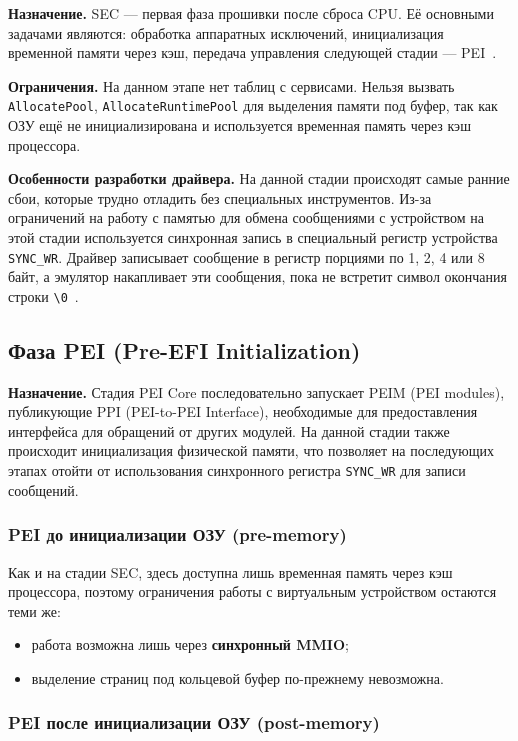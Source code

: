 \textbf{Назначение.} SEC --- первая фаза прошивки после сброса CPU. Её основными задачами являются: обработка аппаратных исключений, инициализация временной памяти через кэш, передача управления следующей стадии --- PEI~\cite{uefi_spec}.

\textbf{Ограничения.} На данном этапе нет таблиц с сервисами. Нельзя вызвать \texttt{AllocatePool}, \texttt{AllocateRuntimePool} для выделения памяти под буфер, так как ОЗУ ещё не инициализирована и используется временная память через кэш процессора.

\textbf{Особенности разработки драйвера.} На данной стадии происходят самые ранние сбои, которые трудно отладить без специальных инструментов. Из-за ограничений на работу с памятью для обмена сообщениями с устройством на этой стадии используется синхронная запись в специальный регистр устройства \texttt{SYNC\_WR}. Драйвер записывает сообщение в регистр порциями по 1, 2, 4 или 8 байт, а эмулятор накапливает эти сообщения, пока не встретит символ окончания строки \texttt{\textbackslash 0}~\cite{stratovirt_repo}.

\subsection{Фаза PEI (Pre-EFI Initialization)}

\textbf{Назначение.} Стадия PEI Core последовательно запускает PEIM (PEI modules),
публикующие PPI (PEI-to-PEI Interface), необходимые для предоставления интерфейса для обращений от других модулей. На данной стадии также происходит инициализация физической памяти, что позволяет на последующих этапах отойти от использования синхронного регистра \texttt{SYNC\_WR} для записи сообщений.

\subsubsection{PEI до инициализации ОЗУ (pre-memory)}

Как и на стадии SEC, здесь доступна лишь временная память через кэш процессора, поэтому ограничения работы с виртуальным устройством остаются теми же:
\begin{itemize}
    \item работа возможна лишь через \textbf{синхронный MMIO};
    \item выделение страниц под кольцевой буфер по-прежнему невозможна.
\end{itemize}

\subsubsection{PEI после инициализации ОЗУ (post-memory)}

